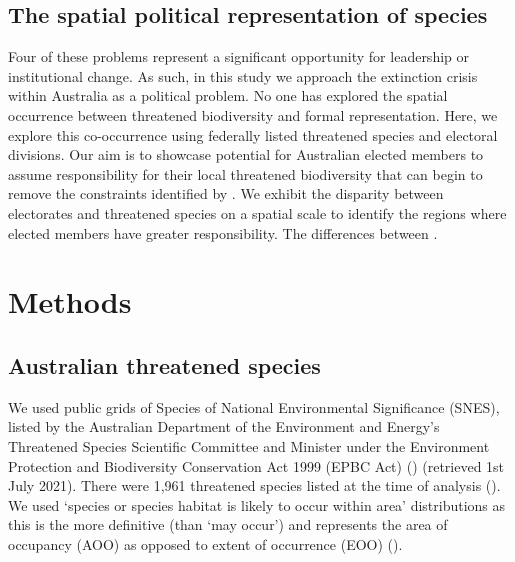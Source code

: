 \documentclass[a4paper,11pt]{article}
\begin{document}
\subsection{The spatial political representation of species}

Four of these problems represent a significant opportunity for leadership or institutional change. As such, in this study we approach the extinction crisis within Australia as a political problem. No one has explored the spatial occurrence between threatened biodiversity and formal representation. Here, we explore this co-occurrence using federally listed threatened species and electoral divisions. Our aim is to showcase potential for Australian elected members to assume responsibility for their local threatened biodiversity that can begin to remove the constraints identified by \cite{leggeMonitoringThreatenedSpecies2018}. We exhibit the disparity between electorates and threatened species on a spatial scale to identify the regions where elected members have greater responsibility. The differences between .

\section{Methods}


\subsection{Australian threatened species}

We used public grids of Species of National Environmental Significance (SNES), listed by the Australian Department of the Environment and Energy’s Threatened Species Scientific Committee and Minister under the Environment Protection and Biodiversity Conservation Act 1999 (EPBC Act) (\cite{commonwealthofaustraliaThreatenedSpeciesEPBC2021}) (retrieved 1st July 2021). There were 1,961 threatened species listed at the time of analysis (\cite{commonwealthofaustraliaThreatenedSpeciesEPBC2021}). We used ‘species or species habitat is likely to occur within area’ distributions as this is the more definitive (than ‘may occur’) and represents the area of occupancy (AOO) as opposed to extent of occurrence (EOO) (\cite{gastonSizesSpeciesGeographic2009}).

\end{document}
